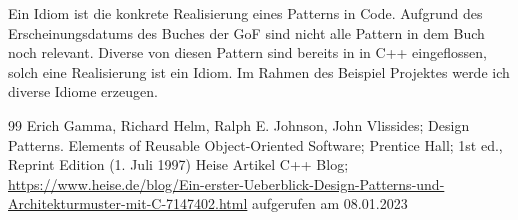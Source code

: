 \documentclass[a4paper, 12pt] {article}
\begin{document}
Ein Idiom ist die konkrete Realisierung eines Patterns in Code. Aufgrund des Erscheinungsdatums des Buches der GoF sind nicht alle Pattern in dem Buch noch relevant. Diverse von diesen Pattern sind bereits in in C++ eingeflossen, solch eine Realisierung ist ein Idiom. Im Rahmen des Beispiel Projektes werde ich diverse Idiome erzeugen.

\begin{thebibliography} {99}
   Erich Gamma, Richard Helm, Ralph E. Johnson, John Vlissides; Design Patterns. Elements of Reusable Object-Oriented Software; Prentice Hall; 1st ed., Reprint Edition (1. Juli 1997)
   Heise Artikel C++ Blog; \url{https://www.heise.de/blog/Ein-erster-Ueberblick-Design-Patterns-und-Architekturmuster-mit-C-7147402.html} aufgerufen am 08.01.2023
\end{thebibliography}

\printindex
\end{document}
